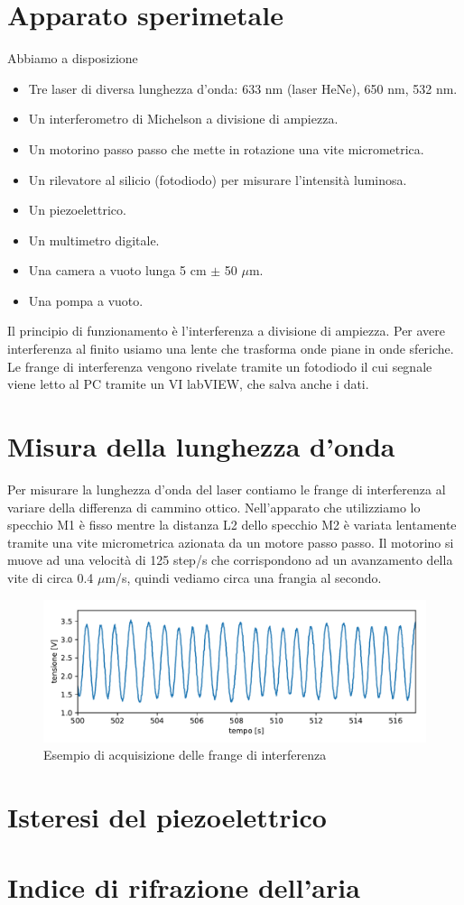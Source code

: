 \documentclass[a4paper]{article}
\begin{document}
\section{Apparato sperimetale}

	Abbiamo a disposizione 
	\begin{itemize}
		\item Tre laser di diversa lunghezza d'onda: 633 nm (laser HeNe), 650 nm, 532 nm.
		\item Un interferometro di Michelson a divisione di ampiezza.
		\item Un motorino passo passo che mette in rotazione una vite micrometrica.
		\item Un rilevatore al silicio (fotodiodo) per misurare l'intensità luminosa.
		\item Un piezoelettrico.
		\item Un multimetro digitale.
		\item Una camera a vuoto lunga 5 cm $\pm$ 50 $\mu$m.
		\item Una pompa a vuoto.
	\end{itemize}
Il principio di funzionamento è l'interferenza a divisione di ampiezza. Per avere interferenza al finito usiamo una lente che trasforma onde piane in onde sferiche. Le frange di interferenza vengono rivelate tramite un fotodiodo il cui segnale viene letto al PC tramite un VI labVIEW, che salva anche i dati.

\section{Misura della lunghezza d'onda}
Per misurare la lunghezza d'onda del laser contiamo le frange di interferenza al variare della differenza di cammino ottico. Nell'apparato che utilizziamo lo specchio M1 è fisso mentre la distanza L2 dello specchio M2 è variata lentamente tramite una vite micrometrica azionata da un motore passo passo.
Il motorino si muove ad una velocità di 125 step/s che corrispondono ad un avanzamento della vite di circa 0.4 $\mu$m/s, quindi vediamo circa una frangia al secondo.
\begin{figure}[H]
	\includegraphics[width=1\textwidth]{esempio_acquisizione.pdf}
	\caption{Esempio di acquisizione delle frange di interferenza}
\end{figure}

\section{Isteresi del piezoelettrico}

\section{Indice di rifrazione dell'aria}
\end{document}
